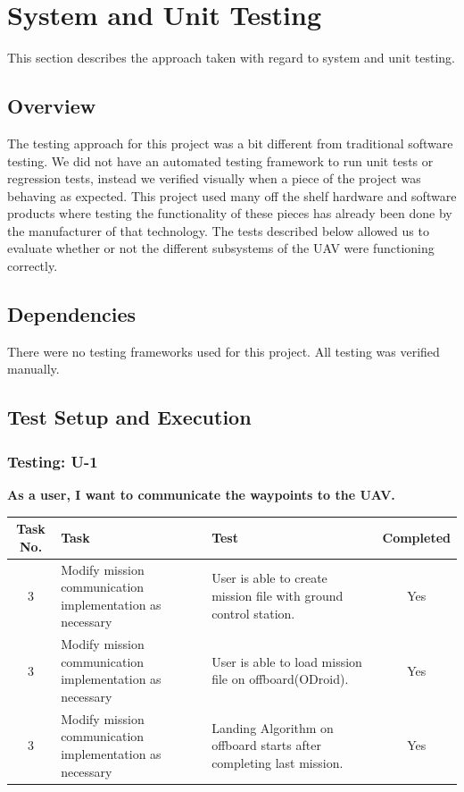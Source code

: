 
\chapter{System  and Unit Testing}

This section describes the approach taken with regard to system and unit testing. 

\section{Overview}
The testing approach for this project was a bit different from traditional software testing. We did not have an automated testing framework to run unit tests or regression tests, instead we verified visually when a piece of the project was behaving as expected. This project used many off the shelf hardware and software products where testing the functionality of these pieces has already been done by the manufacturer of that technology. The tests described below allowed us to evaluate whether or not the different subsystems of the UAV were functioning correctly.

\section{Dependencies}
There were no testing frameworks used for this project. All testing was verified manually.

\newpage
\section{Test Setup and Execution}
\subsection{Testing: U-1}
\textbf{As a user, I want to communicate the waypoints to the UAV.}\\
\begin{tabular}{| c | >{\raggedright}m{4cm} | m{4cm} | c |}\hline
	Task No. & Task & Test & Completed\\\hline
	3 & Modify mission communication implementation as necessary & User is able to create mission file with ground control station. & Yes\\\hline
	3 & Modify mission communication implementation as necessary & User is able to load mission file on offboard(ODroid). & Yes\\\hline
	3 & Modify mission communication implementation as necessary & Landing Algorithm on offboard starts after completing last mission. & Yes\\\hline
\end{tabular}

